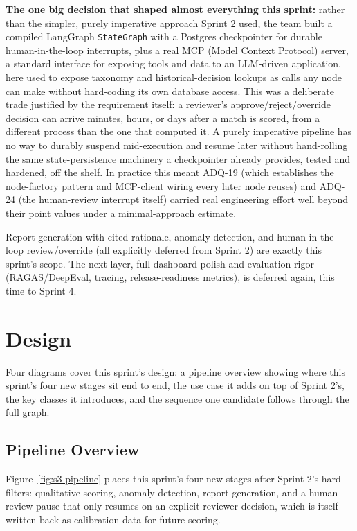 \textbf{The one big decision that shaped almost everything this
sprint:} rather than the simpler, purely imperative approach Sprint 2
used, the team built a compiled LangGraph \texttt{StateGraph} with a
Postgres checkpointer for durable human-in-the-loop interrupts, plus a
real MCP (Model Context Protocol) server, a standard interface for
exposing tools and data to an LLM-driven application, here used to
expose taxonomy and historical-decision lookups as calls any node can
make without hard-coding its own database access. This was a deliberate
trade justified by the requirement itself: a reviewer's
approve/reject/override decision can arrive minutes, hours, or days
after a match is scored, from a different process than the one that
computed it. A purely imperative pipeline has no way to durably suspend
mid-execution and resume later without hand-rolling the same
state-persistence machinery a checkpointer already provides, tested and
hardened, off the shelf. In practice this meant ADQ-19 (which
establishes the node-factory pattern and MCP-client wiring every later
node reuses) and ADQ-24 (the human-review interrupt itself) carried
real engineering effort well beyond their point values under a
minimal-approach estimate.

Report generation with cited rationale, anomaly detection, and
human-in-the-loop review/override (all explicitly deferred from
Sprint 2) are exactly this sprint's scope. The next layer, full
dashboard polish and evaluation rigor (RAGAS/DeepEval, tracing,
release-readiness metrics), is deferred again, this time to Sprint 4.

\section{Design}
\label{sec:s3-design}

Four diagrams cover this sprint's design: a pipeline overview showing
where this sprint's four new stages sit end to end, the use case it
adds on top of Sprint 2's, the key classes it introduces, and the
sequence one candidate follows through the full graph.

\subsection{Pipeline Overview}

Figure~\ref{fig:s3-pipeline} places this sprint's four new stages after
Sprint 2's hard filters: qualitative scoring, anomaly detection, report
generation, and a human-review pause that only resumes on an explicit
reviewer decision, which is itself written back as calibration data for
future scoring.

